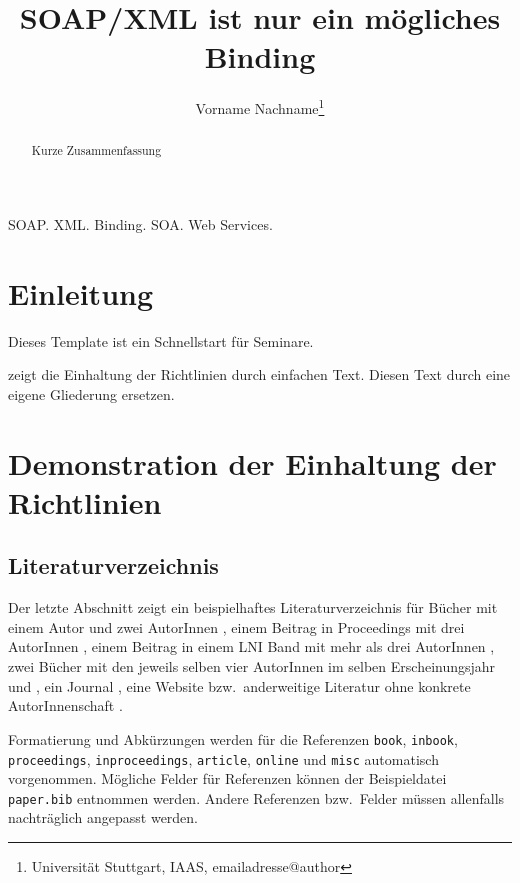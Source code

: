 \documentclass{lni}
\author{Vorname Nachname\footnote{Universität Stuttgart, IAAS, emailadresse@author}}
\title{SOAP/XML ist nur ein mögliches Binding}
\begin{document}
\maketitle

\thispagestyle{lnifirstpage}
\pagestyle{lni}

\setcounter{footnote}{1}

\begin{abstract}
Kurze Zusammenfassung
\end{abstract}

\begin{keywords}
SOAP.
XML.
Binding.
SOA.
Web Services.
\end{keywords}

\section{Einleitung}
Dieses Template ist ein Schnellstart für Seminare.

\blindtext

 zeigt die Einhaltung der Richtlinien durch einfachen Text.
Diesen Text durch eine eigene Gliederung ersetzen.

\section{Demonstration der Einhaltung der Richtlinien}
\label{sec:lniconformance}

\subsection{Literaturverzeichnis}
Der letzte Abschnitt zeigt ein beispielhaftes Literaturverzeichnis für Bücher mit einem Autor \cite{Ez10} und zwei AutorInnen \cite{AB00}, einem Beitrag in Proceedings mit drei AutorInnen \cite{ABC01}, einem Beitrag in einem LNI Band mit mehr als drei AutorInnen \cite{Az09}, zwei Bücher mit den jeweils selben vier AutorInnen im selben Erscheinungsjahr \cite{Wa14} und \cite{Wa14b}, ein Journal \cite{Gl06}, eine Website \cite{GI14} bzw.\ anderweitige Literatur ohne konkrete AutorInnenschaft \cite{XX14}.

Formatierung und Abkürzungen werden für die Referenzen \texttt{book}, \texttt{inbook}, \texttt{proceedings}, \texttt{inproceedings}, \texttt{article}, \texttt{online} und \texttt{misc} automatisch vorgenommen.
Mögliche Felder für Referenzen können der Beispieldatei \texttt{paper.bib} entnommen werden.
Andere Referenzen bzw.\ Felder müssen allenfalls nachträglich angepasst werden.
\end{document}
